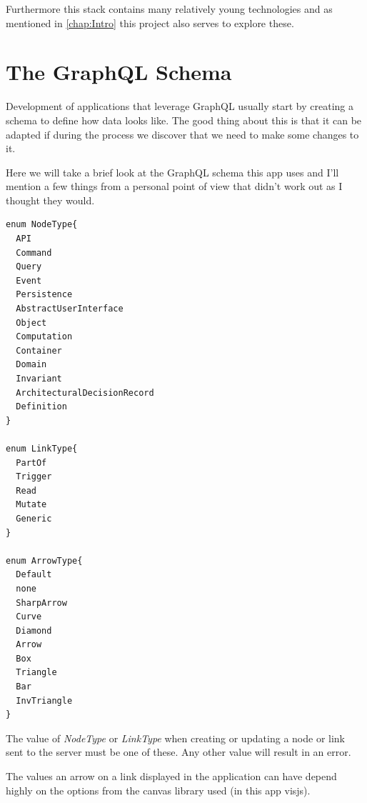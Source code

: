 Furthermore this stack contains many relatively young technologies and as mentioned in \autoref{chap:Intro} this project also serves to explore these.

\section{The GraphQL Schema}
Development of applications that leverage GraphQL usually start by creating a schema to define how data looks like. The good thing about this is that it can be adapted if during the process we discover that we need to make some changes to it.

Here we will take a brief look at the GraphQL schema this app uses and I'll mention a few things from a personal point of view that didn't work out as I thought they would.
\lstset{language=GraphQL}
\begin{lstlisting}[caption={GraphQL Enums},label={enums}]
enum NodeType{
  API
  Command
  Query
  Event
  Persistence
  AbstractUserInterface
  Object
  Computation
  Container
  Domain
  Invariant
  ArchitecturalDecisionRecord
  Definition
}

enum LinkType{
  PartOf
  Trigger
  Read
  Mutate
  Generic
}

enum ArrowType{
  Default
  none
  SharpArrow
  Curve
  Diamond
  Arrow
  Box
  Triangle
  Bar
  InvTriangle
}
\end{lstlisting}
The value of \emph{NodeType} or \emph{LinkType} when creating or updating a node or link sent to the server must be one of these. Any other value will result in an error.

The values an arrow on a link displayed in the application can have depend highly on the options from the canvas library used (in this app visjs).


